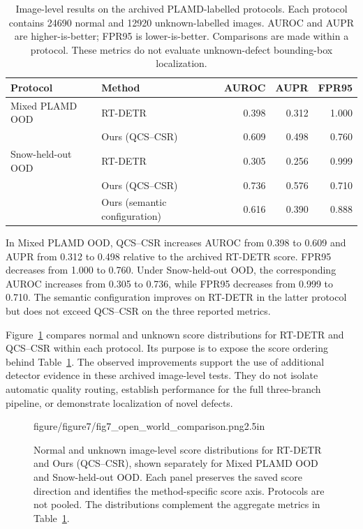 \begin{table}[!t]
  \centering
  \caption{Image-level results on the archived PLAMD-labelled protocols.
  Each protocol contains 24690 normal and 12920 unknown-labelled images.
  AUROC and AUPR are higher-is-better; FPR95 is lower-is-better.
  Comparisons are made within a protocol. These metrics do not evaluate
  unknown-defect bounding-box localization.}
  \label{tab:open_world}
  {\QSDexpTableStyle
  \begin{tabular*}{\textwidth}{@{\extracolsep{\fill}}llrrr@{}}
    \toprule
    Protocol & Method & AUROC & AUPR & FPR95 \\
    \midrule
    Mixed PLAMD OOD & RT-DETR & 0.398 & 0.312 & 1.000 \\
                    & Ours (QCS--CSR) & 0.609 & 0.498 & 0.760 \\
    \midrule
    Snow-held-out OOD & RT-DETR & 0.305 & 0.256 & 0.999 \\
                      & Ours (QCS--CSR) & 0.736 & 0.576 & 0.710 \\
                      & Ours (semantic configuration) & 0.616 & 0.390 & 0.888 \\
    \bottomrule
  \end{tabular*}}
\end{table}

In Mixed PLAMD OOD, QCS--CSR increases AUROC from 0.398 to 0.609 and AUPR
from 0.312 to 0.498 relative to the archived RT-DETR score. FPR95 decreases
from 1.000 to 0.760. Under Snow-held-out OOD, the corresponding AUROC
increases from 0.305 to 0.736, while FPR95 decreases from 0.999 to 0.710.
The semantic configuration improves on RT-DETR in the latter protocol but
does not exceed QCS--CSR on the three reported metrics.

Figure~\ref{fig:open_world_scores} compares normal and unknown score
distributions for RT-DETR and QCS--CSR within each protocol. Its purpose is
to expose the score ordering behind Table~\ref{tab:open_world}.
The observed improvements support the
use of additional detector evidence in these archived image-level tests.
They do not isolate automatic quality routing, establish performance for
the full three-branch pipeline, or demonstrate localization of novel defects.

\begin{figure}[!t]
  \centering
    {figure/figure7/fig7_open_world_comparison.png}{2.5in}
  \caption{Normal and unknown image-level score distributions for RT-DETR
  and Ours (QCS--CSR), shown separately for Mixed PLAMD OOD and
  Snow-held-out OOD. Each panel preserves the saved score direction and
  identifies the method-specific score axis. Protocols are not pooled.
  The distributions complement the aggregate metrics in
  Table~\ref{tab:open_world}.}
  \label{fig:open_world_scores}
\end{figure}

